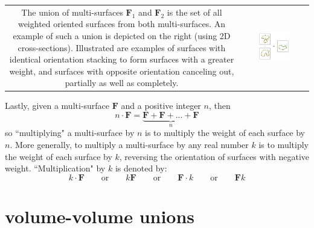 \documentclass{book}
\begin{document}
\begin{tabular}{cc}
\parbox{0.5\textwidth}{
The union of multi-surfaces \(\mathbf{F}_1\) and \(\mathbf{F}_2\) is the set of all weighted oriented surfaces from both multi-surfaces. An example of such a union is depicted on the right (using 2D cross-sections). Illustrated are examples of surfaces with identical orientation stacking to form surfaces with a greater weight, and surfaces with opposite orientation canceling out, partially as well as completely.
} & \parbox{0.5\textwidth}{
\includegraphics[width = 0.5\textwidth]{Unions/multisurface_unions}
}
\end{tabular}

Lastly, given a multi-surface \(\mathbf{F}\) and a positive integer \(n\), then
\[n \cdot \mathbf{F} = \underbrace{\mathbf{F} + \mathbf{F} + ... + \mathbf{F}}_n\]
so ``multiplying" a multi-surface by \(n\) is to multiply the weight of each surface by \(n\). More generally, to multiply a multi-surface by any real number \(k\) is to multiply the weight of each surface by \(k\), reversing the orientation of surfaces with negative weight. ``Multiplication" by \(k\) is denoted by:
\[k \cdot \mathbf{F} \quad\quad\text{or}\quad\quad k\mathbf{F} \quad\quad\text{or}\quad\quad \mathbf{F} \cdot k \quad\quad\text{or}\quad\quad \mathbf{F} k\]



\section{volume-volume unions}

\vspace{5mm}
\end{document}
